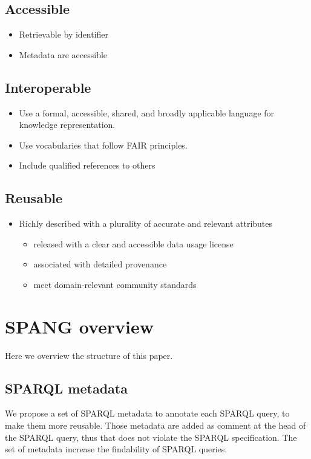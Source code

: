 \documentclass[runningheads]{llncs}
\begin{document}
\subsection{Accessible}
\begin{itemize}
    \item Retrievable by identifier
    \item Metadata are accessible
\end{itemize}

\subsection{Interoperable}
\begin{itemize}
    \item Use a formal, accessible, shared, and broadly applicable language for knowledge representation.
    \item Use vocabularies that follow FAIR principles.
    \item Include qualified references to others
\end{itemize}

\subsection{Reusable}
\begin{itemize}
    \item Richly described with a plurality of accurate and relevant attributes
    \begin{itemize}
        \item released with a clear and accessible data usage license
        \item associated with detailed provenance
        \item meet domain-relevant community standards
    \end{itemize}
\end{itemize}


\section{SPANG overview}
Here we overview the structure of this paper.

\subsection{SPARQL metadata}

We propose a set of SPARQL metadata to annotate each SPARQL query, to make them more reusable.
Those metadata are added as comment at the head of the SPARQL query, thus that does not violate the SPARQL specification. 
The set of metadata increase the findability of SPARQL queries.
\end{document}
